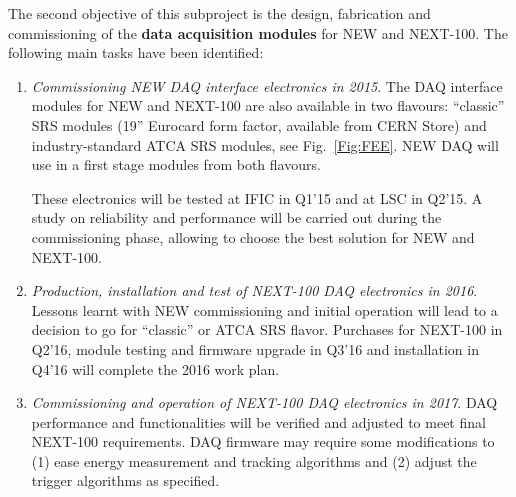 The second objective of this subproject is the design, fabrication and commissioning of the {\bf data acquisition modules} for NEW and NEXT-100. The following main tasks have been identified:

\begin{enumerate}

\item	{\em Commissioning NEW DAQ interface electronics in 2015}. The DAQ interface modules for NEW and NEXT-100 are also available in two flavours: “classic” SRS modules (19” Eurocard form factor, available from CERN Store) and industry-standard ATCA SRS modules, see Fig.~\ref{Fig:FEE}. NEW DAQ will use in a first stage modules from both flavours.

These electronics will be tested at IFIC in Q1’15 and at LSC in Q2’15. A study on reliability and performance will be carried out during the commissioning phase, allowing to choose the best solution for NEW and NEXT-100. 

\item	{\em Production, installation and test of NEXT-100 DAQ electronics in 2016}. Lessons learnt with NEW commissioning and initial operation will lead to a decision to go for “classic” or ATCA SRS flavor. Purchases for NEXT-100 in Q2’16, module testing and firmware upgrade in Q3’16 and installation in Q4’16 will complete the 2016 work plan.

\item	{\em Commissioning and operation of NEXT-100 DAQ electronics in 2017}. DAQ performance and functionalities will be verified and adjusted to meet final NEXT-100 requirements. DAQ firmware may require some modifications to (1) ease energy measurement and tracking algorithms and (2) adjust the trigger algorithms as specified.


\end{enumerate}

